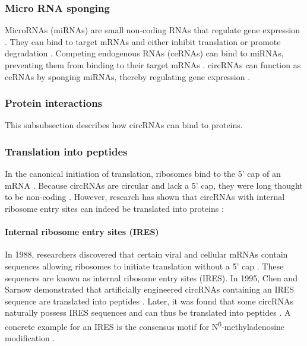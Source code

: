 \subsubsection{Micro RNA sponging}
MicroRNAs (miRNAs) are small non-coding RNAs that regulate gene expression
\supercite{bartel_micrornas_2009}. They can bind to target mRNAs and either
inhibit translation or promote degradation \supercite{bartel_micrornas_2009}.
Competing endogenous RNAs (ceRNAs) can bind to miRNAs, preventing them from
binding to their target mRNAs \supercite{tay_multilayered_2014}. circRNAs can
function as ceRNAs by sponging miRNAs, thereby regulating gene expression
\supercite{xiao_circular_2022}.

\subsubsection{Protein interactions}
This subsubsection describes how circRNAs can bind to proteins.

\subsubsection{Translation into peptides}
In the canonical initiation of translation, ribosomes bind to the 5' cap of an
mRNA \supercite{hinnebusch_mechanism_2012}. Because circRNAs are circular and
lack a 5' cap, they were long thought to be non-coding
\supercite{bao_regulatory_2019,greene_circular_2017}. However, research has
shown that circRNAs with internal ribosome entry sites can indeed be translated
into proteins \supercite{chen_expanding_2020}:

\paragraph{Internal ribosome entry sites (IRES)}
In 1988, researchers discovered that certain viral and cellular mRNAs contain
sequences allowing ribosomes to initiate translation without a 5' cap
\supercite{pelletier_internal_1988, jang_segment_1988}. These sequences are
known as internal ribosome entry sites (IRES). In 1995, Chen and Sarnow
demonstrated that artificially engineered circRNAs containing an IRES sequence
are translated into peptides \supercite{chen_initiation_1995}. Later, it
was found that some circRNAs naturally possess IRES sequences and can thus be
translated into peptides
\supercite{chen_expanding_2020,legnini_circ-znf609_2017,pamudurti_translation_2017}.
A concrete example for an IRES is the consensus motif for
N\textsuperscript{6}-methyladenosine modification \supercite{yang_extensive_2017}.

